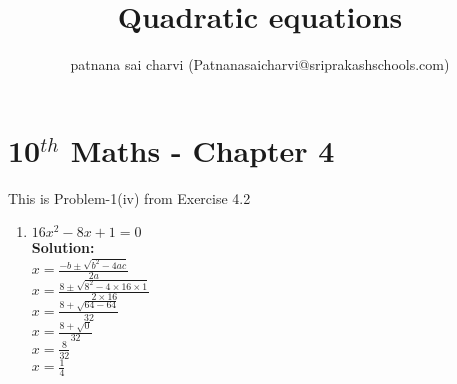 

\newcommand{\mydet}[1]{\ensuremath{\begin{vmatrix}#1\end{vmatrix}}}
\newcommand{\solution}{\noindent \textbf{Solution: }}
\providecommand{\brak}[1]{\ensuremath{\left(#1\right)}}
\providecommand{\norm}[1]{\left\lVert#1\right\rVert}
\let\vec\mathbf

\title{Quadratic equations}
\author{patnana sai charvi (Patnanasaicharvi@sriprakashschools.com)}

\section*{10$^{th}$ Maths - Chapter 4}
This is Problem-1(iv) from Exercise 4.2
\begin{enumerate}
\item ${{16}x^2-{8} x +{1} = 0}$\\
\solution\\
${x=\frac{-b\pm\sqrt{{b^2-4ac}}}{2a}}$\\
${x=\frac{8\pm\sqrt{8^2-4 \times 16\times1}}{2 \times 16}}$\\                                                        ${x=\frac{8+\sqrt{64-64}}{32}}$\\
${x=\frac{8+\sqrt{0}}{32}}$\\
${x=\frac{8}{32}}$\\
${x=\frac{1}{4}}$\\
\end{enumerate}

